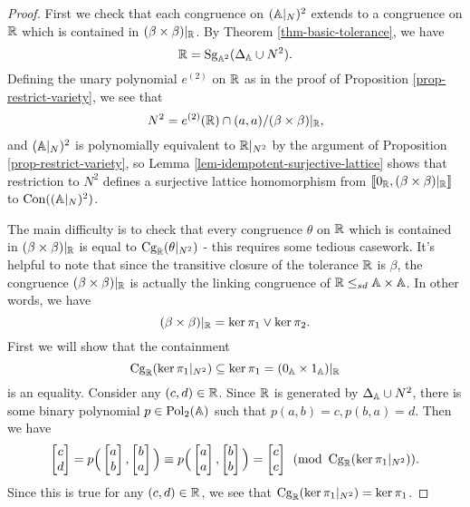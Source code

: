 \begin{appendices}
\begin{proof}
First we check that each congruence on $(\mathbb{A}|_N)^2$ extends to a congruence on $\mathbb{R}$ which is contained in $(\beta \times \beta)|_{\mathbb{R}}$. By Theorem \ref{thm-basic-tolerance}, we have
\[
\mathbb{R} = \operatorname{Sg}_{\mathbb{A}^2}(\Delta_{\mathbb{A}} \cup N^2).
\]
Defining the unary polynomial $e^{(2)}$ on $\mathbb{R}$ as in the proof of Proposition \ref{prop-restrict-variety}, we see that
\[
N^2 = e^{(2)}(\mathbb{R}) \cap (a,a)/(\beta \times \beta)|_{\mathbb{R}},
\]
and $(\mathbb{A}|_N)^2$ is polynomially equivalent to $\mathbb{R}|_{N^2}$ by the argument of Proposition \ref{prop-restrict-variety}, so Lemma \ref{lem-idempotent-surjective-lattice} shows that restriction to $N^2$ defines a surjective lattice homomorphism from $\llbracket 0_{\mathbb{R}}, (\beta \times \beta)|_{\mathbb{R}} \rrbracket$ to $\operatorname{Con}((\mathbb{A}|_N)^2)$.

The main difficulty is to check that every congruence $\theta$ on $\mathbb{R}$ which is contained in $(\beta \times \beta)|_{\mathbb{R}}$ is equal to $\operatorname{Cg}_{\mathbb{R}}(\theta|_{N^2})$ - this requires some tedious casework. It's helpful to note that since the transitive closure of the tolerance $\mathbb{R}$ is $\beta$, the congruence $(\beta \times \beta)|_{\mathbb{R}}$ is actually the linking congruence of $\mathbb{R} \le_{sd} \mathbb{A} \times \mathbb{A}$. In other words, we have
\[
(\beta \times \beta)|_{\mathbb{R}} = \ker \pi_1 \vee \ker \pi_2.
\]
First we will show that the containment
\[
\operatorname{Cg}_{\mathbb{R}}(\ker \pi_1|_{N^2}) \subseteq \ker \pi_1 = (0_{\mathbb{A}} \times 1_{\mathbb{A}})|_{\mathbb{R}}
\]
is an equality. Consider any $(c,d) \in \mathbb{R}$. Since $\mathbb{R}$ is generated by $\Delta_{\mathbb{A}} \cup N^2$, there is some binary polynomial $p \in \operatorname{Pol}_2(\mathbb{A})$ such that $p(a,b) = c, p(b,a) = d$. Then we have
\[
\begin{bmatrix} c\\ d\end{bmatrix} = p\Big(\begin{bmatrix} a\\ b\end{bmatrix}, \begin{bmatrix} b\\ a\end{bmatrix}\Big) \equiv p\Big(\begin{bmatrix} a\\ a\end{bmatrix}, \begin{bmatrix} b\\ b\end{bmatrix}\Big) = \begin{bmatrix} c\\ c\end{bmatrix} \pmod{\operatorname{Cg}_{\mathbb{R}}(\ker \pi_1|_{N^2})}.
\]
Since this is true for any $(c,d) \in \mathbb{R}$, we see that $\operatorname{Cg}_{\mathbb{R}}(\ker \pi_1|_{N^2}) = \ker \pi_1$.


\end{proof}
\end{appendices}
